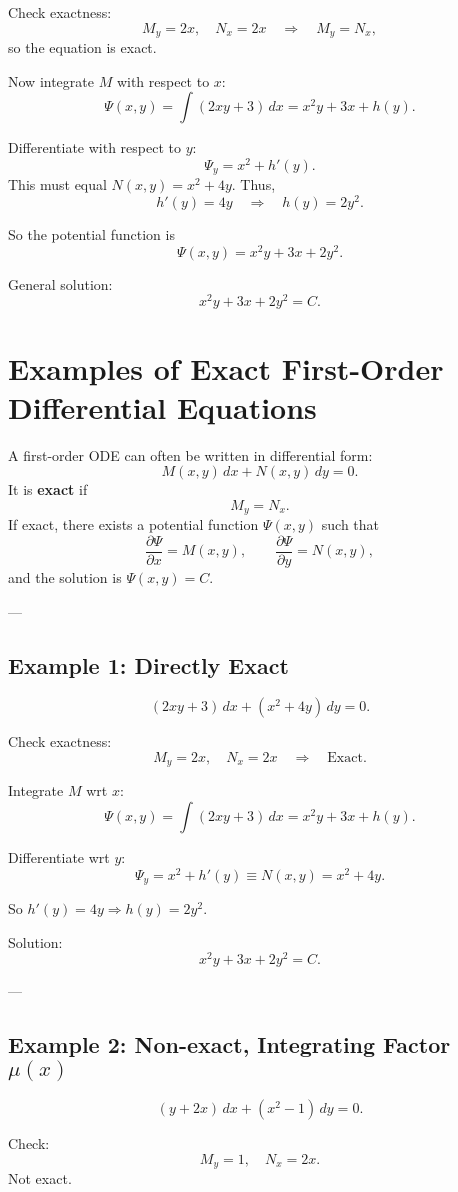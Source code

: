 \documentclass[12pt]{book}
\begin{document}
Check exactness:
\[
M_y = 2x, \quad N_x = 2x \quad \Rightarrow \quad M_y = N_x,
\]
so the equation is exact.

Now integrate $M$ with respect to $x$:
\[
\Psi(x,y) = \int (2xy+3)\,dx = x^2 y + 3x + h(y).
\]

Differentiate with respect to $y$:
\[
\Psi_y = x^2 + h'(y).
\]
This must equal $N(x,y) = x^2 + 4y$.  
Thus,
\[
h'(y) = 4y \quad \Rightarrow \quad h(y) = 2y^2.
\]

So the potential function is
\[
\Psi(x,y) = x^2 y + 3x + 2y^2.
\]

General solution:
\[
\boxed{x^2 y + 3x + 2y^2 = C}.
\]

\section*{Examples of Exact First-Order Differential Equations}

A first-order ODE can often be written in differential form:
\[
M(x,y)\,dx + N(x,y)\,dy = 0.
\]
It is \textbf{exact} if
\[
M_y = N_x.
\]
If exact, there exists a potential function $\Psi(x,y)$ such that
\[
\frac{\partial \Psi}{\partial x} = M(x,y), \qquad \frac{\partial \Psi}{\partial y} = N(x,y),
\]
and the solution is $\Psi(x,y)=C$.

---

\subsection*{Example 1: Directly Exact}
\[
(2xy + 3)\,dx + (x^2 + 4y)\,dy = 0.
\]

Check exactness:  
\[
M_y = 2x, \quad N_x = 2x \quad \Rightarrow \quad \text{Exact}.
\]

Integrate $M$ wrt $x$:  
\[
\Psi(x,y) = \int (2xy+3)\,dx = x^2 y + 3x + h(y).
\]

Differentiate wrt $y$:  
\[
\Psi_y = x^2 + h'(y) \equiv N(x,y) = x^2 + 4y.
\]

So $h'(y)=4y \Rightarrow h(y)=2y^2$.  

Solution:
\[
\boxed{x^2 y + 3x + 2y^2 = C}.
\]

---

\subsection*{Example 2: Non-exact, Integrating Factor $\mu(x)$}
\[
(y + 2x)\,dx + (x^2 - 1)\,dy = 0.
\]

Check:  
\[
M_y = 1, \quad N_x = 2x.
\]
Not exact.  
\end{document}
